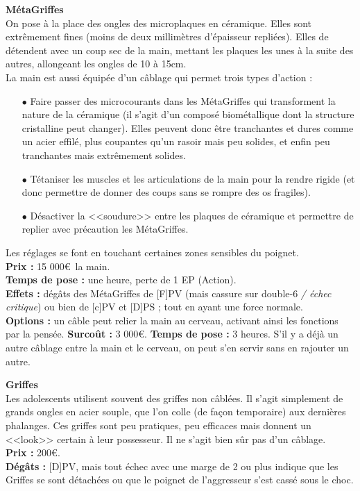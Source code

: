 \documentclass[11pt,twoside,a4paper]{article}
\begin{document}
\begin{multicols*}{2}
\textbf{M{\'e}taGriffes}~\\
On pose {\`a} la place des ongles des microplaques en c{\'e}ramique. Elles sont extr{\^e}mement fines (moins de deux millim{\`e}tres d'{\'e}paisseur repli{\'e}es). Elles de d{\'e}tendent avec un coup sec de la main, mettant les plaques les unes {\`a} la suite des autres, allongeant les ongles de 10 {\`a} 15cm. ~\\
La main est aussi {\'e}quip{\'e}e d'un c{\^a}blage qui permet trois types d'action : 
\begin{itemize}
	\footnotesize
	\item[$\bullet$] Faire passer des microcourants dans les M{\'e}taGriffes qui transforment la nature de la c{\'e}ramique (il s'agit d'un compos{\'e} biom{\'e}tallique dont la structure cristalline peut changer). Elles peuvent donc {\^e}tre tranchantes et dures comme un acier effil{\'e}, plus coupantes qu'un rasoir mais peu solides, et enfin peu tranchantes mais extr{\^e}mement solides. 
	\item[$\bullet$] T{\'e}taniser les muscles et les articulations de la main pour la rendre rigide (et donc permettre de donner des coups sans se rompre des os fragiles). 
	\item[$\bullet$] D{\'e}sactiver la <<soudure>> entre les plaques de c{\'e}ramique et permettre de replier avec pr{\'e}caution les M{\'e}taGriffes. 
\end{itemize}

Les r{\'e}glages se font en touchant certaines zones sensibles du poignet. ~\\
{\small 
	\textbf{Prix : }15 000\euro ~la main. ~\\
	\textbf{Temps de pose : }une heure, perte de 1 EP (Action). ~\\
	\textbf{Effets : }d{\'e}g{\^a}ts des M{\'e}taGriffes de [F]PV (mais cassure sur double-6 \emph{/ {\'e}chec critique}) ou bien de [c]PV et [D]PS ; tout en ayant une force normale. ~\\
	\textbf{Options : } un c{\^a}ble peut relier la main au cerveau, activant ainsi les fonctions par la pens{\'e}e. \textbf{Surco{\^u}t : } 3 000\euro . \textbf{Temps de pose : }3 heures. S'il y a d{\'e}j{\`a} un autre c{\^a}blage entre la main et le cerveau, on peut s'en servir sans en rajouter un autre. ~\\
} %

\textbf{Griffes}~\\
Les adolescents utilisent souvent des griffes non c{\^a}bl{\'e}es. Il s'agit simplement de grands ongles en acier souple, que l'on colle (de fa\c{c}on temporaire) aux derni{\`e}res phalanges. Ces griffes sont peu pratiques, peu efficaces mais donnent un <<look>> certain {\`a} leur possesseur. Il ne s'agit bien s{\^u}r pas d'un c{\^a}blage. ~\\
{\small 
	\textbf{Prix : }200\euro . ~\\
	\textbf{D{\'e}g{\^a}ts : }[D]PV, mais tout {\'e}chec avec une marge de 2 ou plus indique que les Griffes se sont d{\'e}tach{\'e}es ou que le poignet de l'aggresseur s'est cass{\'e} sous le choc. ~\\
} %


\end{multicols*}
\end{document}
